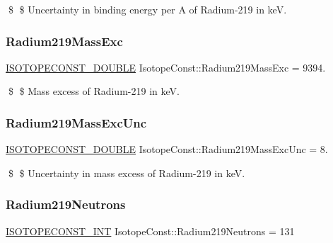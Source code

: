 \$ \$ Uncertainty in binding energy per A of Radium-\/219 in keV. \mbox{\label{group___isotope_const-_radium-_ra219_ga46c4b0e2b11ab146ac19c9260b33c453}} 
\subsubsection{\texorpdfstring{Radium219\+Mass\+Exc}{Radium219MassExc}}
{\footnotesize\ttfamily \mbox{\hyperlink{group___isotope_const-_macros_ga8f45a7272ce02c0b4c65c44636ed719a}{I\+S\+O\+T\+O\+P\+E\+C\+O\+N\+S\+T\+\_\+\+D\+O\+U\+B\+LE}} Isotope\+Const\+::\+Radium219\+Mass\+Exc = 9394.}

\$ \$ Mass excess of Radium-\/219 in keV. \mbox{\label{group___isotope_const-_radium-_ra219_gae82e3cc79cf1c9f65661624adcbd348e}} 
\subsubsection{\texorpdfstring{Radium219\+Mass\+Exc\+Unc}{Radium219MassExcUnc}}
{\footnotesize\ttfamily \mbox{\hyperlink{group___isotope_const-_macros_ga8f45a7272ce02c0b4c65c44636ed719a}{I\+S\+O\+T\+O\+P\+E\+C\+O\+N\+S\+T\+\_\+\+D\+O\+U\+B\+LE}} Isotope\+Const\+::\+Radium219\+Mass\+Exc\+Unc = 8.}

\$ \$ Uncertainty in mass excess of Radium-\/219 in keV. \mbox{\label{group___isotope_const-_radium-_ra219_ga2f6271c7a95ff12c92d11d4353ac13df}} 
\subsubsection{\texorpdfstring{Radium219\+Neutrons}{Radium219Neutrons}}
{\footnotesize\ttfamily \mbox{\hyperlink{group___isotope_const-_macros_ga5f18360b3e99483a35c32d789e62621c}{I\+S\+O\+T\+O\+P\+E\+C\+O\+N\+S\+T\+\_\+\+I\+NT}} Isotope\+Const\+::\+Radium219\+Neutrons = 131}

